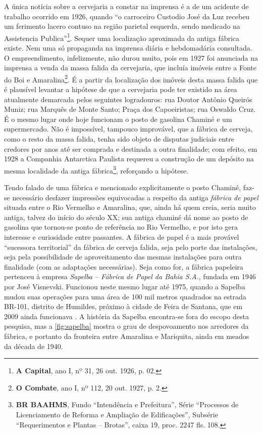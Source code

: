 A única notícia sobre a cervejaria a constar na imprensa é a de um acidente de trabalho ocorrido em 1926, quando ``o carroceiro Custodio José da Luz recebeu um ferimento lacero contuso na região parietal esquerda, sendo medicado na Assistencia Publica''\footnote{\textbf{A Capital}, ano I, nº 31, 26 out. 1926, p. 02.}. Sequer uma localização aproximada da antiga fábrica existe. Nem uma só propaganda na imprensa diária e hebdomadária consultada. O empreendimento, infelizmente, não durou muito, pois em 1927 foi anunciada na imprensa a venda da massa falida da cervejaria, que incluía imóveis entre a Fonte do Boi e Amaralina\footnote{\textbf{O Combate}, ano I, nº 112, 20 out. 1927, p. 2.}. É a partir da localização dos imóveis desta massa falida que é plausível levantar a hipótese de que a cervejaria pode ter existido na área atualmente demarcada pelos seguintes logradouros: rua Doutor Antônio Queirós Muniz; rua Marquês de Monte Santo; Praça dos Capoeiristas; rua Oswaldo Cruz. É o mesmo lugar onde hoje funcionam o posto de gasolina Chaminé e um supermercado. Não é impossível, tampouco improvável, que a fábrica de cerveja, como o resto da massa falida, tenha sido objeto de disputas judiciais entre credores por anos até ser comprada e destinada a outra finalidade; com efeito, em 1928 a Companhia Antarctica Paulista requereu a construção de um depósito na mesma localidade da antiga fábrica\footnote{\textbf{BR BAAHMS}, Fundo ``Intendência e Prefeitura'', Série ``Processos de Licenciamento de Reforma e Ampliação de Edificações'', Subsérie ``Requerimentos e Plantas -- Brotas'', caixa 19, proc. 2247 fls. 108.}, reforçando a hipótese.

Tendo falado de uma fábrica e mencionado explicitamente o posto Chaminé, faz-se necessário desfazer impressões equivocadas a respeito da antiga \textit{fábrica de papel} situada entre o Rio Vermelho e Amaralina, que, ainda há quem creia, seria muito antiga, talvez do início do século XX; sua antiga chaminé dá nome ao posto de gasolina que tornou-se ponto de referência no Rio Vermelho, e por isto gera interesse e curiosidade entre passantes. A fábrica de papel é a mais provável ``sucessora territorial'' da fábrica de cerveja falida, seja pelo porte das instalações, seja pela possibilidade de aproveitamento das mesmas instalações para outra finalidade (com as adaptações necessárias). Seja como for, a fábrica papeleira pertenceu à empresa \textit{Sapelba -- Fábrica de Papel da Bahia S.A.}, fundada em 1946 por José Visnevski. Funcionou neste mesmo lugar até 1975, quando a Sapelba mudou suas operações para uma área de 100 mil metros quadrados na estrada BR-101, distrito de Humildes, próximo à cidade de Feira de Santana, que em 2009 ainda funcionava \cite{sapelba_2015}. A história da Sapelba encontra-se fora do escopo desta pesquisa, mas a \autoref{fig:sapelba} mostra o grau de despovoamento nos arredores da fábrica, e portanto da fronteira entre Amaralina e Mariquita, ainda em meados da década de 1940.

